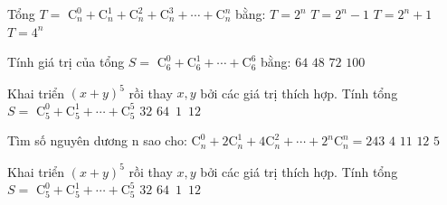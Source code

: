 \begin{ex}
	Tổng $T = \,\,\mathrm{C}_n^0 + \mathrm{C}_n^1 + \mathrm{C}_n^2 + \mathrm{C}_n^3 + \cdots + \mathrm{C}_n^n$ bằng:
	\choice
	{\True $T = {2^n}$}
	{$T = {2^n}- 1$}
	{$T = {2^n} + 1$}
	{$T = {4^n}$}
\end{ex}

\begin{ex}
	Tính giá trị của tổng $S = \,\,\mathrm{C}_6^0 + \mathrm{C}_6^1 + \cdots + \mathrm{C}_6^6$ bằng:
	\choice
	{\True $64$}
	{$48$}
	{$72$}
	{$100$}
	\loigiai{
		\[ S = \,\,\mathrm{C}_6^0 + \mathrm{C}_6^1 + \cdots + \mathrm{C}_6^6 = {2^6} = 64 \]
	}
\end{ex}

\begin{ex}
	Khai triển ${\left( {x + y} \right)^5}$ rồi thay $x,y$ bởi các giá trị thích hợp. Tính tổng $S = \,\,\mathrm{C}_5^0 + \mathrm{C}_5^1 + \cdots + \mathrm{C}_5^5$
	\choice
	{\True $32$}
	{$64$}
	{$\,1$}
	{$\,12$}
\end{ex}

\begin{ex}
	Tìm số nguyên dương n sao cho: $\mathrm{C}_n^0 + 2\mathrm{C}_n^1 + 4\mathrm{C}_n^2 + \cdots + {2^n}\mathrm{C}_n^n = 243$
	\choice
	{$4$}
	{$11$}
	{$12$}
	{\True $5$}
\end{ex}

\begin{ex}
	Khai triển ${\left( {x + y} \right)^5}$ rồi thay $x,y$ bởi các giá trị thích hợp. Tính tổng $S = \,\,\mathrm{C}_5^0 + \mathrm{C}_5^1 + \cdots + \mathrm{C}_5^5$
	\choice
	{\True $32$}
	{$64$}
	{$\,1$}
	{$\,12$}
\end{ex}

